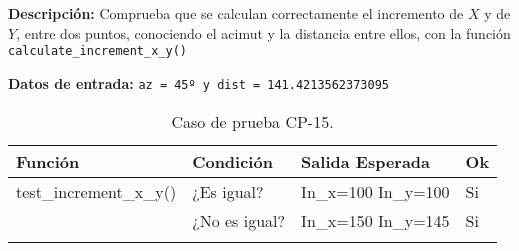 \textbf{Descripción:} Comprueba que se calculan correctamente el incremento de $X$ y de $Y$, entre dos puntos, conociendo el acimut y la distancia entre ellos, con la función \texttt{calculate\_increment\_x\_y()}

\textbf{Datos de entrada:} \texttt{az = 45º y dist = 141.4213562373095}
\newpage

\begin{longtable}[]{@{}llll@{}}
\toprule
\begin{minipage}[b]{0.6\columnwidth}\raggedright\strut
Función\strut
\end{minipage} & \begin{minipage}[b]{0.20\columnwidth}\raggedright\strut
Condición\strut
\end{minipage} & \begin{minipage}[b]{0.15\columnwidth}\raggedright\strut
Salida Esperada\strut
\end{minipage} & \begin{minipage}[b]{0.05\columnwidth}\raggedright\strut
Ok\strut
\end{minipage}\tabularnewline
\midrule
\endhead
\begin{minipage}[t]{0.6\columnwidth}\raggedright\strut
test\_increment\_x\_y()\strut
\end{minipage} & \begin{minipage}[t]{0.20\columnwidth}\raggedright\strut
¿Es igual?\strut
\end{minipage} & \begin{minipage}[t]{0.15\columnwidth}\raggedright\strut
In\_x=100 In\_y=100\strut
\end{minipage} & \begin{minipage}[t]{0.05\columnwidth}\raggedright\strut
Si\strut
\end{minipage}\tabularnewline
\begin{minipage}[t]{0.6\columnwidth}\raggedright\strut
\strut
\end{minipage} & \begin{minipage}[t]{0.20\columnwidth}\raggedright\strut
¿No es igual?\strut
\end{minipage} & \begin{minipage}[t]{0.15\columnwidth}\raggedright\strut
In\_x=150 In\_y=145\strut
\end{minipage} & \begin{minipage}[t]{0.05\columnwidth}\raggedright\strut
Si\strut
\end{minipage}\tabularnewline

\bottomrule
\caption{Caso de prueba CP-15.}
\end{longtable}


